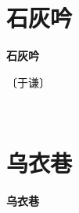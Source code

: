 \documentclass[12pt,UTF-8,openany,fontset=none]{ctexbook}
\begin{document}
\vspace{8pt}
\clearpage


\section{石灰吟}



\begin{center}
    {\bfseries 石灰吟}
\end{center}

\begin{center}
    \vspace{10pt}
    
    \begin{large}
        
        〔于谦〕
        
    \end{large}
    
    \vspace{8pt}
    
    \begin{huge}
        
        \phantom{。}

        \phantom{。}
        
        \phantom{。}~~

        \phantom{。}
        
    \end{huge}
    
\end{center}

\vspace{8pt}
\clearpage


\section{乌衣巷}



\begin{center}
    {\bfseries 乌衣巷}
\end{center}
\end{document}
